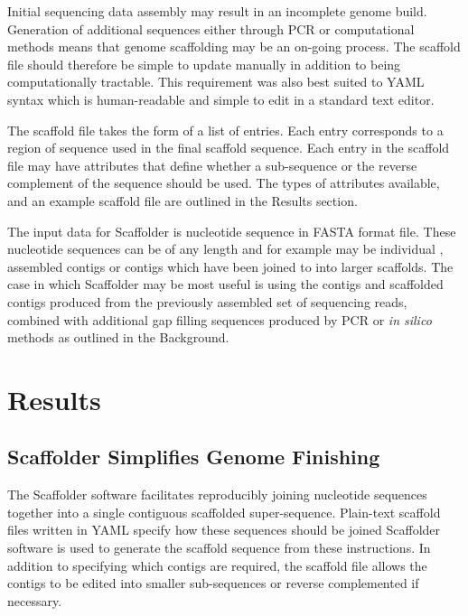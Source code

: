 \documentclass[10pt]{bmc_article}
\newenvironment{bmcformat}{\begin{raggedright}\baselineskip20pt\sloppy\setboolean{publ}{false}}{\end{raggedright}\baselineskip20pt\sloppy}
\begin{document}
\begin{bmcformat}
Initial sequencing data assembly may result in an incomplete genome build.
Generation of additional sequences either through PCR or computational methods
means that genome scaffolding may be an on-going process. The scaffold file
should therefore be simple to update manually in addition to being
computationally tractable. This requirement was also best suited to YAML
syntax which is human-readable and simple to edit in a standard text editor.
\pb

The scaffold file takes the form of a list of entries. Each entry corresponds
to a region of sequence used in the final scaffold sequence. Each entry in the
scaffold file may have attributes that define whether a sub-sequence or the
reverse complement of the sequence should be used. The types of attributes
available, and an example scaffold file are outlined in the Results section.
\pb

The input data for Scaffolder is nucleotide sequence in FASTA format file.
These nucleotide sequences can be of any length and for example may be
individual , assembled contigs or contigs which have
been joined to into larger scaffolds. The case in which Scaffolder may be most
useful is using the contigs and scaffolded contigs produced from the
previously assembled set of sequencing reads, combined with additional gap
filling sequences produced by PCR or \emph{in silico} methods as outlined in
the Background. \pb


\clearpage

\section*{Results} %

\subsection*{Scaffolder Simplifies Genome Finishing} %

The Scaffolder software facilitates reproducibly joining nucleotide sequences
together into a single contiguous scaffolded super-sequence. Plain-text
scaffold files written in  YAML  specify how these
sequences should be joined Scaffolder software is used
to generate the scaffold sequence from these instructions. In addition to
specifying which contigs are required, the scaffold file allows the contigs to
be edited into smaller sub-sequences or reverse complemented if necessary.
 \pb


\end{bmcformat}
\end{document}
